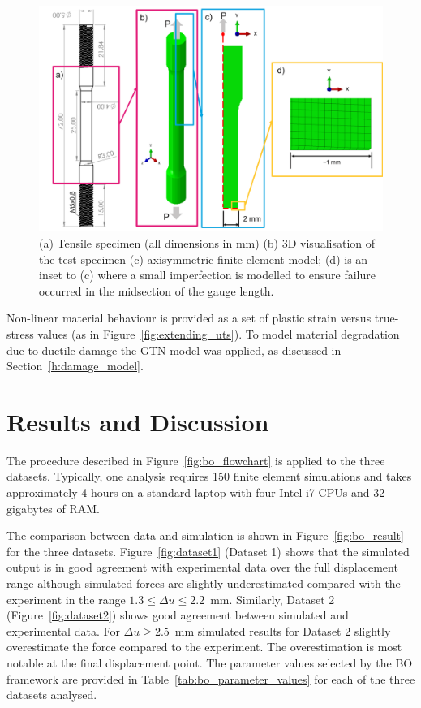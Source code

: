 \documentclass[preprint, review, 12pt]{elsarticle}
\begin{document}
	\begin{figure}[!htbp]
		\centering
		\includegraphics[width=\linewidth, height=0.5\textheight, keepaspectratio]{MODEL_3D_2D}
		\caption{ (a) Tensile specimen (all dimensions in mm) (b) 3D visualisation of the test specimen (c) axisymmetric finite element model; (d) is an inset to (c) where a small imperfection is modelled to ensure failure occurred in the midsection of the gauge length.}
		\label{fig:fe_model}
	\end{figure}

	Non-linear material behaviour is provided as a set of plastic strain versus true-stress values (as in Figure~\ref{fig:extending_uts}).
	To model material degradation due to ductile damage the GTN model was applied, as discussed in Section~\ref{h:damage_model}.

	\section{Results and Discussion}
	\label{h:results}

	The procedure described in Figure~\ref{fig:bo_flowchart} is applied to the three datasets.
	Typically, one analysis requires 150 finite element simulations and takes approximately 4 hours on a standard laptop with four Intel i7 CPUs and 32 gigabytes of RAM.

	The comparison between data and simulation is shown in Figure~\ref{fig:bo_result} for the three datasets.
	Figure~\ref{fig:dataset1} (Dataset 1) shows that the simulated output is in good agreement with experimental data over the full displacement range although simulated forces are slightly underestimated compared with the experiment in the range $1.3 \leq \Delta u \leq 2.2$~mm.
	Similarly, Dataset 2 (Figure~\ref{fig:dataset2}) shows good agreement between simulated and experimental data.
	For $\Delta u \geq 2.5$~mm simulated results for Dataset 2 slightly overestimate the force compared to the experiment.
	The overestimation is most notable at the final displacement point.
	The parameter values selected by the BO framework are provided in Table~\ref{tab:bo_parameter_values} for each of the three datasets analysed.
\end{document}
